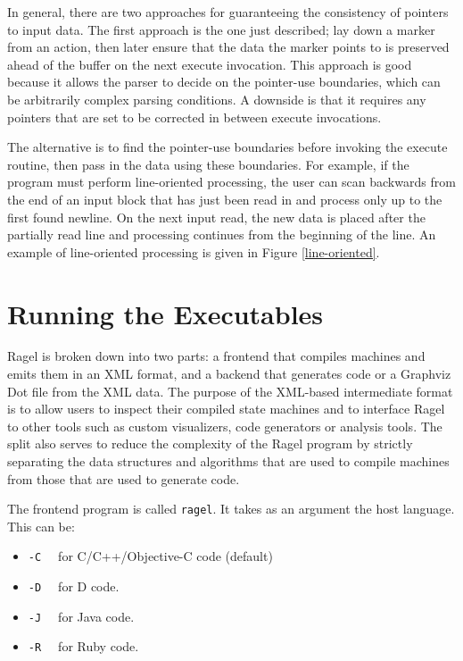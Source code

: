 \documentclass[letterpaper,11pt,oneside]{book}
\begin{document}
In general, there are two approaches for guaranteeing the consistency of
pointers to input data. The first approach is the one just described;
lay down a marker from an action,
then later ensure that the data the marker points to is preserved ahead of
the buffer on the next execute invocation. This approach is good because it
allows the parser to decide on the pointer-use boundaries, which can be
arbitrarily complex parsing conditions. A downside is that it requires any
pointers that are set to be corrected in between execute invocations.

The alternative is to find the pointer-use boundaries before invoking the execute
routine, then pass in the data using these boundaries. For example, if the
program must perform line-oriented processing, the user can scan backwards from
the end of an input block that has just been read in and process only up to the
first found newline. On the next input read, the new data is placed after the
partially read line and processing continues from the beginning of the line.
An example of line-oriented processing is given in Figure \ref{line-oriented}.


\section{Running the Executables}

Ragel is broken down into two parts: a frontend that compiles machines
and emits them in an XML format, and a backend that generates code or a
Graphviz Dot file from the XML data. The purpose of the XML-based intermediate
format is to allow users to inspect their compiled state machines and to
interface Ragel to other tools such as custom visualizers, code generators or
analysis tools. The split also serves to reduce the complexity of the Ragel
program by strictly separating the data structures and algorithms that are used
to compile machines from those that are used to generate code. 

\vspace{10pt}

\noindent The frontend program is called \verb|ragel|. It takes as an argument the host
language. This can be:

\begin{itemize}
\item \verb|-C  | for C/C++/Objective-C code (default)
\item \verb|-D  | for D code.
\item \verb|-J  | for Java code.
\item \verb|-R  | for Ruby code.
\end{itemize}
\end{document}
